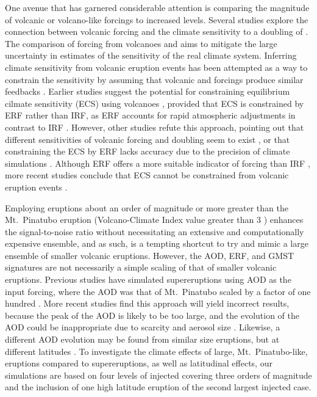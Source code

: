 \documentclass[draft]{agujournal2019}
\begin{document}
  One avenue that has garnered considerable attention is comparing the magnitude of
  volcanic or volcano-like forcings to increased  levels. Several studies
  explore the connection between volcanic forcing and the climate sensitivity to a
  doubling of 
  \cite{boer2007,marvel2016,merlis2014,ollila2016,richardson2019,salvi2022,wigley2005}.
  The comparison of forcing from volcanoes and  aims to mitigate the large
  uncertainty in estimates of the sensitivity of the real climate system. Inferring
  climate sensitivity from volcanic eruption events has been attempted as a way to
  constrain the sensitivity \cite{boer2007} by assuming that volcanic and 
  forcings produce similar feedbacks \cite{pauling2023}. Earlier studies suggest the
  potential for constraining equilibrium cilmate sensitivity (ECS) using volcanoes
  \cite{bender2010}, provided that ECS is constrained by ERF rather than IRF, as ERF
  accounts for rapid atmospheric adjustments in contrast to IRF
  \cite{smith2018,richardson2019,marshall2020}. However, other studies refute this
  approach, pointing out that different sensitivities of volcanic forcing and 
  doubling seem to exist \cite{douglass2006}, or that constraining the ECS by ERF lacks
  accuracy due to the precision of climate simulations \cite{boer2007,salvi2022}.
  Although ERF offers a more suitable indicator of forcing than IRF
  \cite{marvel2016,richardson2019}, more recent studies conclude that ECS cannot be
  constrained from volcanic eruption events \cite{pauling2023}.

  Employing eruptions about an order of magnitude or more greater than the Mt.\ Pinatubo
  eruption (Volcano-Climate Index value greater than \(3\) \cite{schmidt2022}) enhances
  the signal-to-noise ratio without necessitating an extensive and computationally
  expensive ensemble, and as such, is a tempting shortcut to try and mimic a large
  ensemble of smaller volcanic eruptions. However, the AOD, ERF, and GMST signatures are
  not necessarily a simple scaling of that of smaller volcanic eruptions. Previous
  studies have simulated supereruptions using AOD as the input forcing, where the AOD
  was that of Mt.\ Pinatubo scaled by a factor of one hundred \cite{jones2005}. More
  recent studies find this approach will yield incorrect results, because the peak of
  the AOD is likely to be too large, and the evolution of the AOD could be inappropriate
  due to  scarcity and aerosol size \cite{timmreck2009,timmreck2010}. Likewise, a
  different AOD evolution may be found from similar size eruptions, but at different
  latitudes \cite{schneider2009,marshall2020,zhuo2024}. To investigate the climate
  effects of large, Mt.\ Pinatubo-like, eruptions compared to supereruptions, as well as
  latitudinal effects, our simulations are based on four levels of injected 
  covering three orders of magnitude and the inclusion of one high latitude eruption of
  the second largest injected  case.
\end{document}
